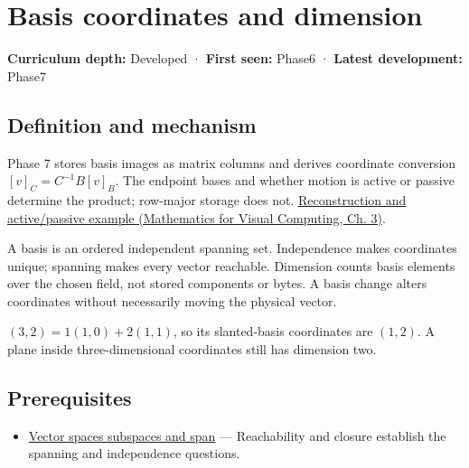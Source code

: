 \hypertarget{appendix-ce0341f7ea0d}{}\label{referencestart:appendix-ce0341f7ea0d}
\section{Basis coordinates and dimension}\label{appendix-ce0341f7ea0d-basis-coordinates-and-dimension}

\textbf{Curriculum depth:} Developed · \textbf{First seen:} Phase6 · \textbf{Latest development:} Phase7

\begin{allmightroledefinition}

\subsection{Definition and mechanism}\label{appendix-ce0341f7ea0d-definition-and-mechanism}

Phase 7 stores basis images as matrix columns and derives coordinate conversion \([v]_C=C^{-1}B[v]_B\). The endpoint bases and whether motion is active or passive determine the product; row-major storage does not. \href{../02-Mathematics-for-Visual-Computing/main.pdf\#nameddest=01-foundations-i-ch019-coordinates-can-change-while-the-geometric-object-stays-still}{Reconstruction and active/passive example (Mathematics for Visual Computing, Ch. 3)}.

\end{allmightroledefinition}

A basis is an ordered independent spanning set. Independence makes coordinates unique; spanning makes every vector reachable. Dimension counts basis elements over the chosen field, not stored components or bytes. A basis change alters coordinates without necessarily moving the physical vector.

\((3,2)=1(1,0)+2(1,1)\), so its slanted-basis coordinates are \((1,2)\). A plane inside three-dimensional coordinates still has dimension two.

\subsection{Prerequisites}\label{appendix-ce0341f7ea0d-prerequisites}

\begin{itemize}
\tightlist
\item
  \hyperref[appendix-173b52c063ae]{Vector spaces subspaces and span} --- Reachability and closure establish the spanning and independence questions.
\end{itemize}

